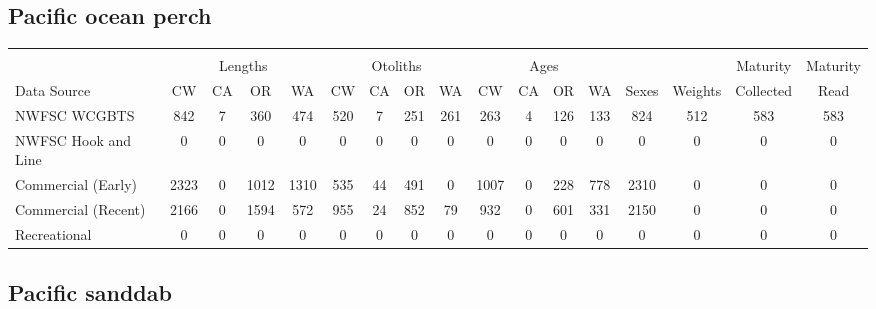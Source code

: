 \documentclass[12pt,]{article}
\begin{document}
\FloatBarrier  

\subsection{Pacific ocean perch}\label{pacific-ocean-perch}

\begin{table}[ht]
\centering
\begingroup\fontsize{10pt}{10pt}\selectfont
\begin{tabular}{|l|cccc|cccc|cccc|c|c|c|c|}
  \hline
 &  &  &  &  &  &  &  &  &  &  &  &  &  &  &  &  \\ 
   & \multicolumn{4}{c}{Lengths} &  \multicolumn{4}{c}{Otoliths} & \multicolumn{4}{c}{Ages} &  & & Maturity & Maturity\\
 Data Source & CW & CA & OR & WA & CW & CA & OR & WA & CW & CA & OR & WA & Sexes & Weights & Collected & Read\\
 \hline
NWFSC WCGBTS & 842 & 7 & 360 & 474 & 520 & 7 & 251 & 261 & 263 & 4 & 126 & 133 & 824 & 512 & 583 & 583 \\ 
  NWFSC Hook and Line & 0 & 0 & 0 & 0 & 0 & 0 & 0 & 0 & 0 & 0 & 0 & 0 & 0 & 0 & 0 & 0 \\ 
  Commercial (Early) & 2323 & 0 & 1012 & 1310 & 535 & 44 & 491 & 0 & 1007 & 0 & 228 & 778 & 2310 & 0 & 0 & 0 \\ 
  Commercial (Recent) & 2166 & 0 & 1594 & 572 & 955 & 24 & 852 & 79 & 932 & 0 & 601 & 331 & 2150 & 0 & 0 & 0 \\ 
  Recreational & 0 & 0 & 0 & 0 & 0 & 0 & 0 & 0 & 0 & 0 & 0 & 0 & 0 & 0 & 0 & 0 \\ 
   \hline
\end{tabular}
\endgroup
\end{table}

\FloatBarrier  

\subsection{Pacific sanddab}\label{pacific-sanddab}
\end{document}
